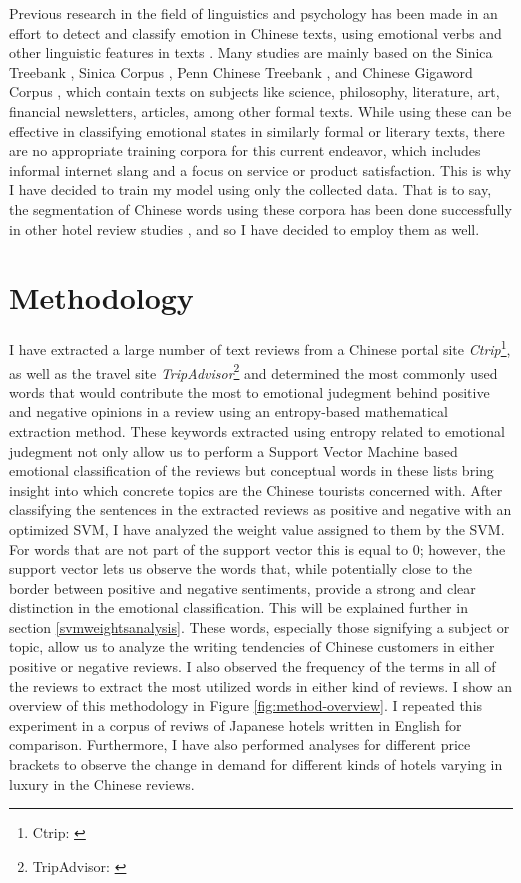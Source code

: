 \documentclass[review]{elsarticle}
\begin{document}
Previous research in the field of linguistics and psychology has been made in an effort to detect and classify emotion in Chinese texts, using emotional verbs and other linguistic features in texts \cite[e.g.][]{lee2010-b, chen2010emotion}. Many studies are mainly based on the Sinica Treebank \cite{chen1999}, Sinica Corpus \cite{huang1992}, Penn Chinese Treebank \cite{xue2005}, and Chinese Gigaword Corpus \cite{huang2005}, which contain texts on subjects like science, philosophy, literature, art, financial newsletters, articles, among other formal texts. While using these can be effective in classifying emotional states in similarly formal or literary texts, there are no appropriate training corpora for this current endeavor, which includes informal internet slang and a focus on service or product satisfaction. This is why I have decided to train my model using only the collected data. That is to say, the segmentation of Chinese words using these corpora has been done successfully in other hotel review studies \cite[e.g.][]{chen20181325}, and so I have decided to employ them as well.

\section{Methodology}\label{method}

I have extracted a large number of text reviews from a Chinese portal site \textit{Ctrip}\footnote{\label{ctrip}Ctrip: \href {www.ctrip.com/}{}}, as well as the travel site \textit{TripAdvisor}\footnote{\label{tripadvisor}TripAdvisor: \href {www.tripadvisor.com/}{}} and determined the most commonly used words that would contribute the most to emotional judegment behind positive and negative opinions in a review using an entropy-based mathematical extraction method. These keywords extracted using entropy related to emotional judegment not only allow us to perform a Support Vector Machine based emotional classification of the reviews but conceptual words in these lists bring insight into which concrete topics are the Chinese tourists concerned with. After classifying the sentences in the extracted reviews as positive and negative with an optimized SVM, I have analyzed the weight value assigned to them by the SVM. For words that are not part of the support vector this is equal to 0; however, the support vector lets us observe the words that, while potentially close to the border between positive and negative sentiments, provide a strong and clear distinction in the emotional classification. This will be explained further in section \ref{svmweightsanalysis}. These words, especially those signifying a subject or topic, allow us to analyze the writing tendencies of Chinese customers in either positive or negative reviews. I also observed the frequency of the terms in all of the reviews to extract the most utilized words in either kind of reviews. I show an overview of this methodology in Figure \ref{fig:method-overview}. I repeated this experiment in a corpus of reviws of Japanese hotels written in English for comparison. Furthermore, I have also performed analyses for different price brackets to observe the change in demand for different kinds of hotels varying in luxury in the Chinese reviews.
\end{document}
